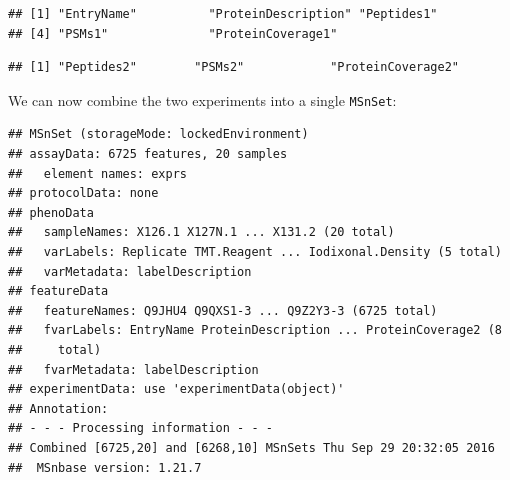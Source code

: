 \begin{knitrout}
\color{fgcolor}\begin{kframe}
\begin{alltt}
\hlstd{(hyperLOPIT2015ms3r1)[}\hlopt{:}\hlstd{]} \hlkwb{<-} \hlstd{(}\hlstd{(hyperLOPIT2015ms3r1)[}\hlopt{:}\hlstd{],} \hlstd{)}
\hlstd{(hyperLOPIT2015ms3r2)[}\hlopt{:}\hlstd{]} \hlkwb{<-} \hlstd{(}\hlstd{(hyperLOPIT2015ms3r2)[}\hlopt{:}\hlstd{],} \hlstd{)}
 \hlkwb{<-} \hlstd{(hyperLOPIT2015ms3r1)[}\hlopt{:}\hlstd{]}
 \hlkwb{<-} \hlstd{(hyperLOPIT2015ms3r2)[}\hlopt{:}\hlstd{]}
\end{alltt}
\begin{verbatim}
## [1] "EntryName"          "ProteinDescription" "Peptides1"         
## [4] "PSMs1"              "ProteinCoverage1"
\end{verbatim}
\begin{alltt}
\end{alltt}
\begin{verbatim}
## [1] "Peptides2"        "PSMs2"            "ProteinCoverage2"
\end{verbatim}
\end{kframe}
\end{knitrout}

We can now combine the two experiments into a single \texttt{MSnSet}:

\begin{knitrout}
\color{fgcolor}\begin{kframe}
\begin{alltt}
 \hlkwb{<-} 
\end{alltt}
\begin{verbatim}
## MSnSet (storageMode: lockedEnvironment)
## assayData: 6725 features, 20 samples 
##   element names: exprs 
## protocolData: none
## phenoData
##   sampleNames: X126.1 X127N.1 ... X131.2 (20 total)
##   varLabels: Replicate TMT.Reagent ... Iodixonal.Density (5 total)
##   varMetadata: labelDescription
## featureData
##   featureNames: Q9JHU4 Q9QXS1-3 ... Q9Z2Y3-3 (6725 total)
##   fvarLabels: EntryName ProteinDescription ... ProteinCoverage2 (8
##     total)
##   fvarMetadata: labelDescription
## experimentData: use 'experimentData(object)'
## Annotation:  
## - - - Processing information - - -
## Combined [6725,20] and [6268,10] MSnSets Thu Sep 29 20:32:05 2016 
##  MSnbase version: 1.21.7
\end{verbatim}
\end{kframe}
\end{knitrout}

